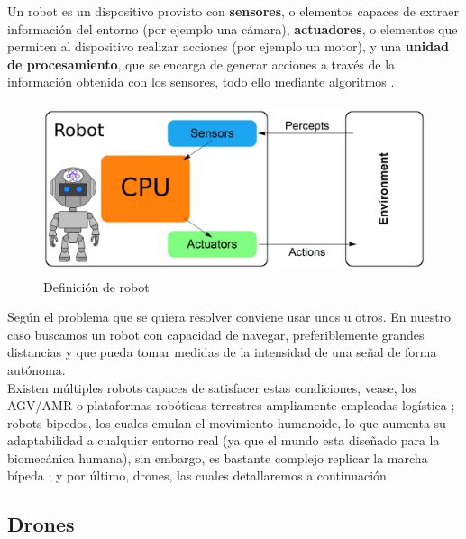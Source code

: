 Un robot es un dispositivo provisto con \textbf{sensores}, o elementos capaces de extraer información del entorno (por ejemplo una cámara), \textbf{actuadores}, o elementos que permiten al dispositivo realizar acciones (por ejemplo un motor), y una \textbf{unidad de procesamiento}, que se encarga de generar acciones a través de la información obtenida con los sensores, todo ello mediante algoritmos \cite{Wang2022}.\\

\begin{figure} [H]
	\begin{center}
	\includegraphics[height=5cm]{imagenes/cap1/3_robot.png}
	\end{center}
	\caption[Definición de robot]{Definición de robot}
	\label{fig:robot_def}
\end{figure}

Según el problema que se quiera resolver conviene usar unos u otros. En nuestro caso buscamos un robot con capacidad de navegar, preferiblemente grandes distancias y que pueda tomar medidas de la intensidad de una señal de forma autónoma.\\

Existen múltiples robots capaces de satisfacer estas condiciones, vease, los AGV/AMR o plataformas robóticas terrestres ampliamente empleadas logística \cite{agv-vs-amr}; robots bipedos, los cuales emulan el movimiento humanoide, lo que aumenta su adaptabilidad a cualquier entorno real (ya que el mundo esta diseñado para la biomecánica humana), sin embargo, es bastante complejo replicar la marcha bípeda \cite{10.3389/fmech.2020.00011}; y por último, drones, las cuales detallaremos a continuación.

\subsection{Drones}
\label{subsec:drones}

